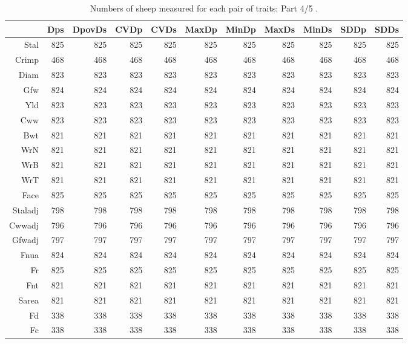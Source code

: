 \begin{table}[p]
\footnotesize
\centering
\caption{Numbers of sheep measured for each pair of traits: Part 4/5
.} 
\label{tab:counts4}
\begin{tabular}{rrrrrrrrrrr}
  \hline
 & Dps & DpovDs & CVDp & CVDs & MaxDp & MinDp & MaxDs & MinDs & SDDp & SDDs \\ 
  \hline
Stal & 825 & 825 & 825 & 825 & 825 & 825 & 825 & 825 & 825 & 825 \\ 
  Crimp & 468 & 468 & 468 & 468 & 468 & 468 & 468 & 468 & 468 & 468 \\ 
  Diam & 823 & 823 & 823 & 823 & 823 & 823 & 823 & 823 & 823 & 823 \\ 
  Gfw & 824 & 824 & 824 & 824 & 824 & 824 & 824 & 824 & 824 & 824 \\ 
  Yld & 823 & 823 & 823 & 823 & 823 & 823 & 823 & 823 & 823 & 823 \\ 
  Cww & 823 & 823 & 823 & 823 & 823 & 823 & 823 & 823 & 823 & 823 \\ 
  Bwt & 821 & 821 & 821 & 821 & 821 & 821 & 821 & 821 & 821 & 821 \\ 
  WrN & 821 & 821 & 821 & 821 & 821 & 821 & 821 & 821 & 821 & 821 \\ 
  WrB & 821 & 821 & 821 & 821 & 821 & 821 & 821 & 821 & 821 & 821 \\ 
  WrT & 821 & 821 & 821 & 821 & 821 & 821 & 821 & 821 & 821 & 821 \\ 
  Face & 825 & 825 & 825 & 825 & 825 & 825 & 825 & 825 & 825 & 825 \\ 
  Staladj & 798 & 798 & 798 & 798 & 798 & 798 & 798 & 798 & 798 & 798 \\ 
  Cwwadj & 796 & 796 & 796 & 796 & 796 & 796 & 796 & 796 & 796 & 796 \\ 
  Gfwadj & 797 & 797 & 797 & 797 & 797 & 797 & 797 & 797 & 797 & 797 \\ 
  Fnua & 824 & 824 & 824 & 824 & 824 & 824 & 824 & 824 & 824 & 824 \\ 
  Fr & 825 & 825 & 825 & 825 & 825 & 825 & 825 & 825 & 825 & 825 \\ 
  Fnt & 821 & 821 & 821 & 821 & 821 & 821 & 821 & 821 & 821 & 821 \\ 
  Sarea & 821 & 821 & 821 & 821 & 821 & 821 & 821 & 821 & 821 & 821 \\ 
  Fd & 338 & 338 & 338 & 338 & 338 & 338 & 338 & 338 & 338 & 338 \\ 
  Fc & 338 & 338 & 338 & 338 & 338 & 338 & 338 & 338 & 338 & 338 \\ 

\end{tabular}
\end{table}
